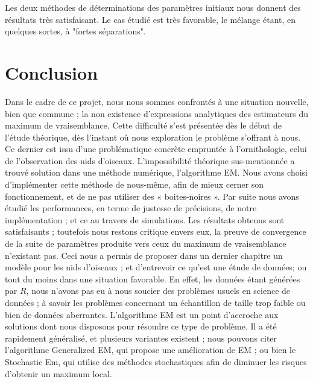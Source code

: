 \documentclass[frenchb]{report}
\newcommand{\1}{\mathbbm{1}}
\theoremstyle{definition}\newtheorem{defn}{Définition}
\theoremstyle{definition}\newtheorem{exm}{Exemple}
\theoremstyle{definition}\newtheorem{nota}{Notation}
\theoremstyle{definition}\newtheorem{rem}{Remarque}
\begin{document}
Les deux méthodes de déterminations des paramètres initiaux nous donnent des résultats très satisfaisant. Le cas étudié est très favorable, le mélange étant, en quelques sortes, à "fortes séparations".



\chapter*{Conclusion}

Dans le cadre de ce projet, nous nous sommes confrontés à une situation nouvelle, bien que commune ; la non existence d’expressions analytiques des estimateurs du maximum de vraisemblance. Cette difficulté s'est présentée dès le début de l'étude théorique, dès l'instant où nous exploration le problème s'offrant à nous. Ce dernier est issu d'une problématique concrète empruntée à l'ornithologie, celui de l'observation des nids d'oiseaux. \newline
\break 
L'impossibilité théorique sus-mentionnée a trouvé solution dans une méthode numérique, l’algorithme EM. \newline
\break
Nous avons choisi d’implémenter cette méthode de nous-même, afin de mieux cerner son fonctionnement, et de ne pas utiliser des « boites-noires ». Par suite nous avons étudié les performances, en terme de justesse de précisions, de notre implémentation ; et ce au travers de simulations. Les résultats obtenus sont satisfaisants ; toutefois nous restons critique envers eux, la preuve de convergence de la suite de paramètres produite vers ceux du maximum de vraisemblance n’existant pas. \newline
Ceci nous a permis de proposer dans un dernier chapitre un modèle pour les nids d’oiseaux ; et d’entrevoir ce qu’est une étude de données; ou tout du moins dans une situation favorable. En effet, les données étant générées par $R$, nous n’avons pas eu à nous soucier des problèmes usuels en science de données ; à savoir les problèmes concernant un échantillon de taille trop faible ou bien de données aberrantes.\newline
\break
L’algorithme EM est un point d’accroche aux solutions dont nous disposons pour résoudre ce type de problème. Il a été rapidement généralisé, et plusieurs variantes existent ; nous pouvons citer l’algorithme Generalized EM, qui propose une amélioration de EM ; ou bien le Stochastic Em, qui utilise des méthodes stochastiques afin de diminuer les risques d’obtenir un maximum local.
\end{document}
